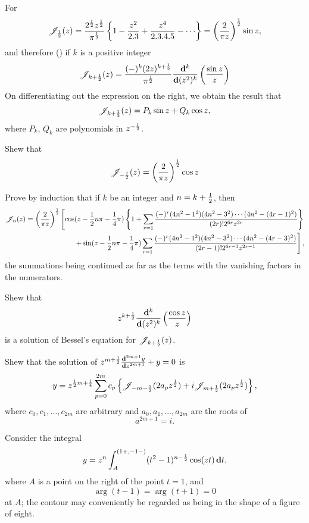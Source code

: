 For
$$
\besJ_{\half}(z)
=
\frac{2^{\half} z^{\half}}{\pi^{\half}}
\thebrace{ 1
  - \frac{z^{2}}{2.3}
  + \frac{z^{4}}{2.3.4.5}
  - \cdots
}
= \theparen{ \frac{2}{\pi z}  }^{\half}
\sin z,
$$
and therefore () if $k$ is a
positive integer
$$
\mathscr{J}_{k+\frac{1}{2}}(z)
=
\frac{(-)^{k} (2z)^{k+\frac{1}{2}}}{\pi^{\frac{1}{2}}}
\frac{\mathbf{d}^{k}}{\mathbf{d} (z^{2})^{k}}
\left(  \frac{\sin z}{z}   \right)
$$
On differentiating out the expression on the right, we obtain the
result that
$$
\mathscr{J}_{k+\frac{1}{2}}(z) = P_{k} \sin z + Q_{k} \cos z,
$$
where $P_{k}$, $Q_{k}$ are polynomials in $z^{-\frac{1}{2}}$.
\begin{wandwexample}
  Shew that
  $$
  \mathscr{J}_{-\frac{1}{2}}(z) = \left(  \frac{2}{\pi z} \right)^{\frac{1}{2}} \cos z
  $$
\end{wandwexample}
%
%
\begin{wandwexample}
  Prove by induction that if $k$ be an integer and $n = k + \frac{1}{2}$,
  then
  \begin{align*}
    \mathscr{J}_{n}(z)
    =
    \left( \frac{2}{\pi z} \right)^{\frac{1}{2}}
    \left[
      \cos(z - \frac{1}{2} n \pi - \frac{1}{4}\pi)
      \left\{ 
        1
        +
        \sum_{r=1}
        \frac{(-)^{r} (4n^{2}-1^{2})(4n^{2}-3^{2})\cdots(4n^{2}-(4r-1)^{2})}{(2r)! 2^{6r} z^{2r}}
       \right\}
    \right.
    \\
    \left.
      +
      \sin(z - \frac{1}{2} n \pi - \frac{1}{4}\pi)
      \sum_{r=1}
      \frac{(-)^{r} (4n^{2}-1^{2})(4n^{2}-3^{2})\cdots(4n^{2}-(4r-3)^{2})}{(2r-1)!
        2^{6r-3} z^{2r-1}}
    \right],
  \end{align*}
  the summations being continued as far as the terms with the
  vanishing factors in the numerators.
\end{wandwexample}
\begin{wandwexample}
  Shew that
  $$
  z^{k+\frac{1}{2}} \frac{\mathbf{d}^{k}}{\mathbf{d} (z^{2})^{k}} \left( \frac{\cos z}{z} \right)
  $$
  is a solution of Bessel's equation for $\mathscr{J}_{k+\frac{1}{2}}(z)$.
\end{wandwexample}
\begin{wandwexample}
  Shew that the solution of
  $
  z^{m+\frac{1}{2}} \frac{\mathbf{d}^{2m+1} y}{\mathbf{d} z^{2m+1}} + y = 0
  $
  is
  $$
  y
  =
  z^{\frac{1}{2} m + \frac{1}{4}}
  \sum_{p=0}^{2m}
  c_{p}
  \left\{  \mathscr{J}_{-m-\frac{1}{2}}(2a_{p}z^{\frac{1}{2}}) + i\mathscr{J}_{m+\frac{1}{2}}(2a_{p}z^{\frac{1}{2}}) \right\},
  $$
  where
  $c_{0},c_{1},\ldots,c_{2m}$ are arbitrary and
  $a_{0},a_{1},\ldots,a_{2m}$ are the roots of
  $$a^{2m+1}=i.
  $$
\end{wandwexample}
Consider the integral
$$
y = z^{n} \int_{A}^{(1+,-1-)} (t^{2}-1)^{n-\frac{1}{2}} \cos(zt) \, \mathbf{d} t,
$$
where $A$ is a point on the right of the point $t=1$, and
$$
\arg(t-1) = \arg(t+1) = 0
$$
at $A$; the contour may conveniently be regarded as being in the shape
of a figure of eight.

